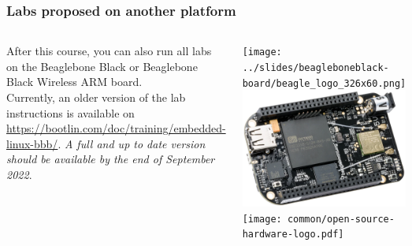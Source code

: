 \begin{frame}
\frametitle{Labs proposed on another platform}
  \begin{columns}
    After this course, you can also run all labs on the Beaglebone Black
    or Beaglebone Black Wireless ARM board.\\
    \vspace{1em}
    Currently, an older version of the lab instructions is available on
    \url{https://bootlin.com/doc/training/embedded-linux-bbb/}. {\em A full
    and up to date version should be available by the end of September 2022}.
    \begin{center}
      \texttt{[image: ../slides/beagleboneblack-board/beagle\_logo\_326x60.png]}\\
      \includegraphics[width=\textwidth]{../slides/beagleboneblack-board/beagleboneblack.png}\\
      \texttt{[image: common/open-source-hardware-logo.pdf]}
    \end{center}
  \end{columns}
\end{frame}
